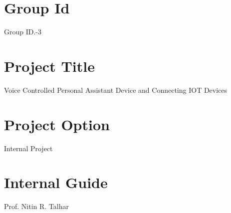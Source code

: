 \documentclass[16pt,oneside,a4paper]{article}
\begin{document}
\section{Group Id}
Group ID.-3

\section{Project Title}
Voice Controlled Personal Assistant Device and Connecting IOT Devices
\section{ Project Option }
Internal Project

\section{Internal Guide}
Prof. Nitin R. Talhar
\end{document}
